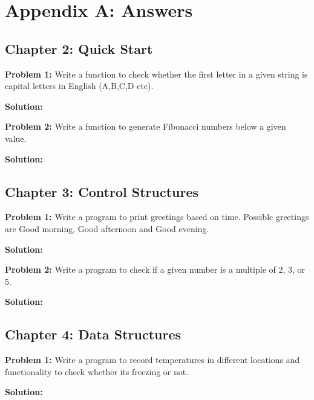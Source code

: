 \cleardoublepage
{}
\chapter*{Appendix A: Answers}

\section*{Chapter 2: Quick Start}

\textbf{Problem 1:} Write a function to check whether the first letter
in a given string is capital letters in English (A,B,C,D etc).

\textbf{Solution:}



\textbf{Problem 2:} Write a function to generate Fibonacci numbers
below a given value.

\textbf{Solution:}



\section*{Chapter 3: Control Structures}

\textbf{Problem 1:} Write a program to print greetings based on time.
Possible greetings are Good morning, Good afternoon and Good evening.

\textbf{Solution:}



\textbf{Problem 2:} Write a program to check if a given number is a multiple of 2, 3, or 5.

\textbf{Solution:}



\section*{Chapter 4: Data Structures}

\textbf{Problem 1:} Write a program to record temperatures
in different locations and functionality to check whether its freezing or not.

\textbf{Solution:}


